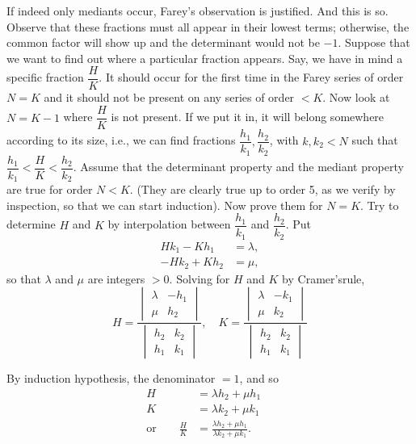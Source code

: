 If indeed only mediants occur, Farey's observation is justified. And
this is so. Observe that these fractions must all appear in their
lowest terms; otherwise, the common factor will show up and the
determinant would not be $-1$. Suppose that we want to find out where
a particular fraction appears. Say, we have in mind a specific
fraction $\dfrac{H}{K}$. It should occur for the first time in the
Farey series of order $N=K$ and it should not be present on any series
of order $< K$. Now look at $N=K-1$ where $\dfrac{H}{K}$ is not
present. If we put it in, it will belong somewhere according to its
size, i.e., we can find fractions $\dfrac{h_1}{k_1},
\dfrac{h_2}{k_2}$, with $k, k_2 < N$ such that $\dfrac{h_1}{k_1} <
\dfrac{H}{K} < \dfrac{h_2}{k_2}$. Assume that the determinant property
and the mediant property are true for order $N< K$. (They are clearly
true up to order 5, as we verify by inspection, so that we can start
induction). Now prove them for $N=K$. Try to determine $H$ and $K$ by
interpolation between $\dfrac{h_1}{k_1}$ and $\dfrac{h_2}{k_2}$. Put
\begin{align*}
  Hk_1 - Kh_1  & = \lambda,\\
  - Hk_2 + Kh_2 & = \mu,
\end{align*}
so that $\lambda$ and $\mu$ are integers $>0$. Solving for $H$ and $K$
by Cramer's\pageoriginale rule,
$$
H= \frac{\begin{vmatrix} \lambda & -h_1\\ \mu & h_2 \end{vmatrix}}{
  \begin{vmatrix} h_2 & k_2\\ h_1 & k_1 \end{vmatrix}}, \quad K=
  \frac{\begin{vmatrix} \lambda & -k_1\\ \mu & k_2 \end{vmatrix}}{
    \begin{vmatrix} h_2 & k_2\\ h_1 & k_1 \end{vmatrix}}
$$

By induction hypothesis, the denominator $=1$, and so
\begin{align*}
  H & = \lambda h_2 + \mu h_1\\
  K & = \lambda k_2 + \mu k_1\\
  \text{or} \qquad \frac{H}{K} & = \frac{\lambda h_2 + \mu
    h_1}{\lambda k_2+ \mu k_1}.\qquad 
\end{align*}

